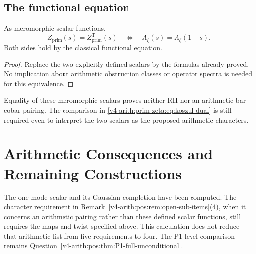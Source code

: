 \subsection{The functional equation}
\label{v4-arith:prim-zeta:att-4-match}
\label{v4-arith:prim-zeta:fingerprint}
\begin{proposition}
\label{v4-arith:prim-zeta:prop:char-functional-eq}
As meromorphic scalar functions,
\begin{equation}
\label{v4-arith:prim-zeta:eq:char-functional-eq}
 Z_{\mathrm{prim}}(s)=Z_{\mathrm{prim}}^{\mathrm T}(s)
 \quad\Longleftrightarrow\quad
 \Lambda_\zeta(s)=\Lambda_\zeta(1-s).
\end{equation}
Both sides hold by the classical functional equation.
\end{proposition}
\begin{proof}
Replace the two explicitly defined scalars by the formulas already
proved. No implication about arithmetic obstruction classes or operator
spectra is needed for this equivalence.
\end{proof}
\begin{remark}
\label{v4-arith:prim-zeta:rem:caveat-fingerprint}
\label{v4-arith:prim-zeta:rem:domain}
Equality of these meromorphic scalars proves neither RH nor an arithmetic
bar--cobar pairing. The comparison in
\eqref{v4-arith:prim-zeta:eq:koszul-dual} is still required even to
interpret the two scalars as the proposed arithmetic characters.
\end{remark}

\section{Arithmetic Consequences and Remaining Constructions}
\label{v4-arith:prim-zeta:consequence-p1}
\label{v4-arith:prim-zeta:reduction-sub-items}
\begin{remark}
\label{v4-arith:prim-zeta:cor:p1-residual-reduced}
\label{v4-arith:prim-zeta:rem:p1-form}
The one-mode scalar and its Gaussian completion have been computed.
The character requirement in
Remark~\ref{v4-arith:pos:rem:open-sub-items}(4), when it concerns an arithmetic
pairing rather than these defined scalar functions, still requires the
maps and twist specified above. This calculation does not reduce that
arithmetic list from five requirements to four. The P1 level comparison
remains Question~\ref{v4-arith:pos:thm:P1-full-unconditional}.
\end{remark}

